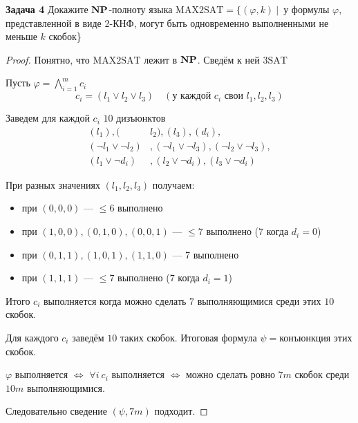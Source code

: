 \textbf{Задача 4} Докажите $\textbf{NP}$-полноту языка $\mathrm{MAX2SAT}=\{(\varphi,k)\ |$\ у формулы $\varphi$, представленной в виде 2-КНФ, могут быть одновременно выполненными не меньше $k$ скобок\}

\begin{proof} 
Понятно, что $\mathrm{MAX2SAT}$ лежит в $\textbf{NP}$. Сведём к ней $\mathrm{3SAT}$

Пусть $\varphi=\bigwedge\limits_{i=1}^{m} c_i$
\[c_i=(l_1\vee l_2 \vee l_3)\quad (\text{у каждой $c_i$ свои $l_1, l_2, l_3$})\]

Заведем для каждой $c_i$ $10$ дизъюнктов
\begin{align*}
	(l_1),(&l_2),(l_3),(d_i),\\
	(\neg l_1 \vee \neg l_2)&,(\neg l_1 \vee \neg l_3),(\neg l_2 \vee \neg l_3),\\
	(l_1\vee \neg d_i)&,(l_2 \vee \neg d_i), (l_3 \vee \neg d_i)
\end{align*}

При разных значениях $(l_1, l_2, l_3)$ получаем:
\begin{itemize}
	\item при $(0,0,0)$ --- $\le 6$ выполнено  
	\item при $(1,0,0),(0,1,0),(0,0,1)$ --- $\le 7$ выполнено ($7$ когда $d_i=0$)
	\item при $(0,1,1),(1,0,1),(1,1,0)$ --- 7 выполнено
	\item при $(1,1,1)$ --- $\le 7$ выполнено ($7$ когда $d_i=1$)
\end{itemize}

Итого $c_i$ выполняется когда можно сделать $7$ выполняющимися среди этих $10$ скобок.

Для каждого $c_i$ заведём $10$ таких скобок. Итоговая формула 
$\psi=$конъюнкция этих скобок.

$\varphi$ выполняется $\iff$ $\forall i\ c_i$ выполняется $\iff$ можно сделать ровно $7m$ скобок среди $10m$ выполняющимися.

Следовательно сведение $(\psi, 7m)$ подходит.
\end{proof}